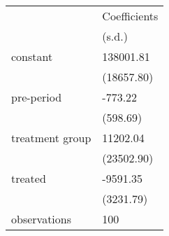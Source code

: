 \begin{tabular}{ll}
\toprule
{} & Coefficients \\
{} &       (s.d.) \\
\midrule
constant        &    138001.81 \\
                &   (18657.80) \\
pre-period      &      -773.22 \\
                &     (598.69) \\
treatment group &     11202.04 \\
                &   (23502.90) \\
treated         &     -9591.35 \\
                &    (3231.79) \\
observations    &          100 \\
\bottomrule
\end{tabular}
